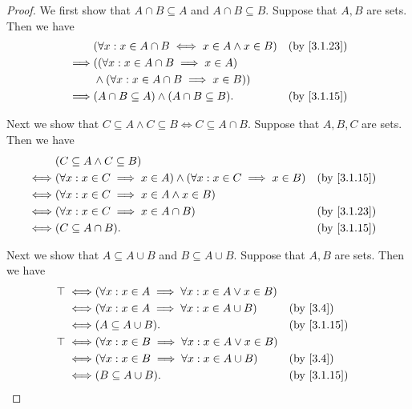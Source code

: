 \begin{proof}
  We first show that \(A \cap B \subseteq A\) and \(A \cap B \subseteq B\).
  Suppose that \(A, B\) are sets.
  Then we have
  \begin{align*}
             & (\forall x : x \in A \cap B \iff x \in A \land x \in B) &  & \by{3.1.23} \\
    \implies & ((\forall x : x \in A \cap B \implies x \in A)                           \\
             & \land (\forall x : x \in A \cap B \implies x \in B))                     \\
    \implies & (A \cap B \subseteq A) \land (A \cap B \subseteq B).    &  & \by{3.1.15}
  \end{align*}

  Next we show that \(C \subseteq A \land C \subseteq B \iff C \subseteq A \cap B\).
  Suppose that \(A, B, C\) are sets.
  Then we have
  \begin{align*}
         & (C \subseteq A \land C \subseteq B)                                                                  \\
    \iff & (\forall x : x \in C \implies x \in A) \land (\forall x : x \in C \implies x \in B) &  & \by{3.1.15} \\
    \iff & (\forall x : x \in C \implies x \in A \land x \in B)                                                 \\
    \iff & (\forall x : x \in C \implies x \in A \cap B)                                       &  & \by{3.1.23} \\
    \iff & (C \subseteq A \cap B).                                                             &  & \by{3.1.15}
  \end{align*}

  Next we show that \(A \subseteq A \cup B\) and \(B \subseteq A \cup B\).
  Suppose that \(A, B\) are sets.
  Then we have
  \begin{align*}
    \top \iff & (\forall x : x \in A \implies \forall x : x \in A \lor x \in B)                             \\
    \iff      & (\forall x : x \in A \implies \forall x : x \in A \cup B)       &  & \text{(by \cref{3.4})} \\
    \iff      & (A \subseteq A \cup B).                                         &  & \by{3.1.15}            \\
    \top \iff & (\forall x : x \in B \implies \forall x : x \in A \lor x \in B)                             \\
    \iff      & (\forall x : x \in B \implies \forall x : x \in A \cup B)       &  & \text{(by \cref{3.4})} \\
    \iff      & (B \subseteq A \cup B).                                         &  & \by{3.1.15}
  \end{align*}


\end{proof}
